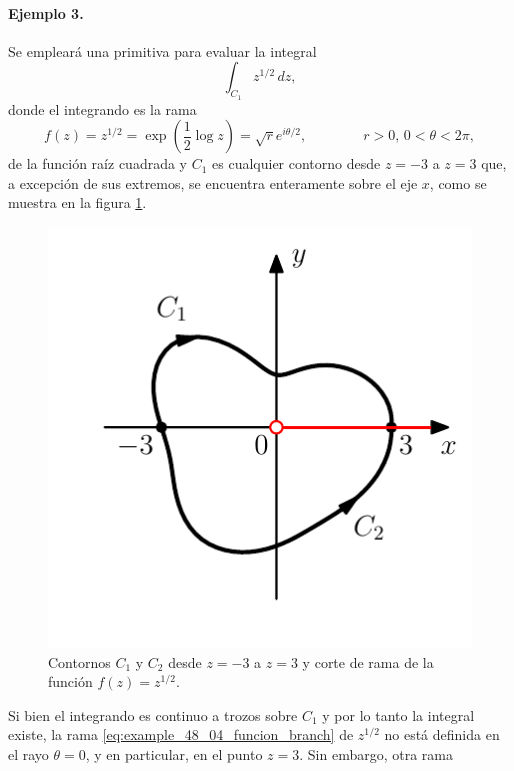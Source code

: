 \documentclass[a4paper]{report}
\begin{document}
\paragraph{Ejemplo 3.} Se empleará una primitiva para evaluar la integral
\[
 \int_{C_1}z^{1/2}\,dz,
\]
donde el integrando es la rama 
\begin{equation}\label{eq:example_48_04_funcion_branch}
 f(z)=z^{1/2}=\exp\left(\frac{1}{2}\log z\right)=\sqrt{r}e^{i\theta/2},
 \qquad\qquad
 r>0,\,0<\theta<2\pi,
\end{equation}
de la función raíz cuadrada y \(C_1\) es cualquier contorno desde \(z=-3\) a \(z=3\) que, a excepción de sus extremos, se encuentra enteramente sobre el eje \(x\), como se muestra en la figura \ref{fig:example_48_04}.
\begin{figure}[!htb]
  \begin{minipage}[c]{0.35\textwidth}
    \includegraphics[width=\textwidth]{figuras/example_48_04.pdf}
  \end{minipage}\hfill
  \begin{minipage}[c]{0.55\textwidth}
    \caption{
        Contornos \(C_1\) y \(C_2\) desde \(z=-3\) a \(z=3\) y corte de rama de la función \(f(z)=z^{1/2}\).
    }\label{fig:example_48_04}
  \end{minipage}
\end{figure}
Si bien el integrando es continuo a trozos sobre \(C_1\) y por lo tanto la integral existe, la rama \ref{eq:example_48_04_funcion_branch} de \(z^{1/2}\) no está definida en el rayo \(\theta=0\), y en particular, en el punto \(z=3\). Sin embargo, otra rama
\end{document}
